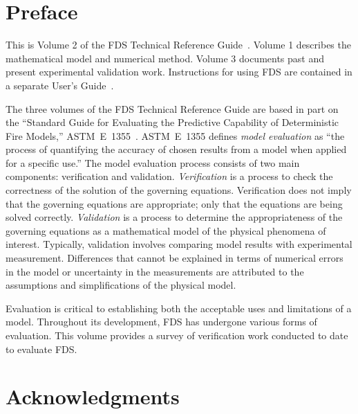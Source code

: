 \documentclass[11pt]{book}
\begin{document}
\frontmatter

\pagestyle{plain}




\chapter{Preface}

This is Volume 2 of the FDS Technical Reference Guide~\cite{FDS_Tech_Guide}. Volume 1 describes the mathematical model and
numerical method. Volume 3 documents past and present experimental validation work. Instructions for
using FDS are contained in a separate User's Guide~\cite{FDS_Users_Guide}.

The three volumes of the FDS Technical Reference Guide are based in part on the ``Standard Guide for
Evaluating the Predictive Capability of Deterministic Fire Models,'' ASTM~E~1355~\cite{ASTM:E1355}.
ASTM~E~1355 defines {\em model evaluation} as ``the process of quantifying
the accuracy of chosen results from a model when applied for a specific use.''
The model evaluation process consists of two main components: verification and validation.
{\em Verification} is a process to check the correctness of the solution of the
governing equations. Verification does not imply that the governing equations are
appropriate; only that the equations are being solved correctly.
{\em Validation} is a process to determine the appropriateness of the governing equations as a mathematical
model of the physical phenomena of interest. Typically, validation involves comparing
model results with experimental measurement. Differences that cannot be explained in terms of
numerical errors in the model or uncertainty in the measurements
are attributed to the assumptions and simplifications of the physical model.

Evaluation is critical to establishing both the acceptable uses
and limitations of a model. Throughout its development, FDS has undergone various forms of evaluation.
This volume provides a survey of verification work conducted to date to evaluate FDS.





\chapter{Acknowledgments}

\label{acksection}
\end{document}
